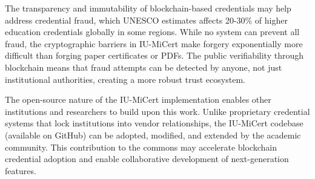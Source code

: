 The transparency and immutability of blockchain-based credentials may help address credential fraud, which UNESCO estimates affects 20-30\% of higher education credentials globally in some regions. While no system can prevent all fraud, the cryptographic barriers in IU-MiCert make forgery exponentially more difficult than forging paper certificates or PDFs. The public verifiability through blockchain means that fraud attempts can be detected by anyone, not just institutional authorities, creating a more robust trust ecosystem.

The open-source nature of the IU-MiCert implementation enables other institutions and researchers to build upon this work. Unlike proprietary credential systems that lock institutions into vendor relationships, the IU-MiCert codebase (available on GitHub) can be adopted, modified, and extended by the academic community. This contribution to the commons may accelerate blockchain credential adoption and enable collaborative development of next-generation features.

